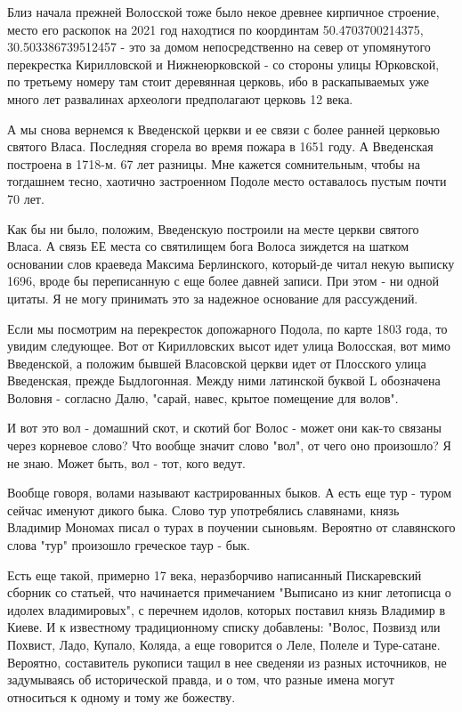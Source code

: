 \documentclass[a5paper,11pt,openany]{article}
\begin{document}
    Близ начала прежней Волосской тоже было некое древнее кирпичное строение, место его раскопок на 2021 год находтися по координтам
50.4703700214375, 30.503386739512457 - это за домом непосредственно на север от упомянутого перекрестка Кирилловской и Нижнеюрковской - со стороны улицы Юрковской, по третьему номеру там стоит деревянная церковь, ибо в раскапываемых уже много лет развалинах археологи предполагают церковь 12 века. 

   А мы снова вернемся к Введенской церкви и ее связи с более ранней церковью святого Власа. Последняя сгорела во время пожара в 1651 году. А Введенская построена в 1718-м. 67 лет разницы. Мне кажется сомнительным, чтобы на тогдашнем тесно, хаотично застроенном Подоле место оставалось пустым почти 70 лет. 

   Как бы ни было, положим, Введенскую построили на месте церкви святого Власа. А связь ЕЕ места со святилищем бога Волоса зиждется на шатком основании слов краеведа Максима Берлинского, который-де читал некую выписку 1696, вроде бы переписанную с еще более давней записи. При этом - ни одной цитаты. Я не могу принимать это за надежное основание для рассуждений.

   Если мы посмотрим на перекресток допожарного Подола, по карте 1803 года, то увидим следующее. Вот от Кирилловских высот идет улица Волосская, вот мимо Введенской, а положим бывшей Власовской церкви идет от Плосского улица Введенская, прежде Быдлогонная. Между ними латинской буквой L обозначена Воловня - согласно Далю, "сарай, навес, крытое помещение для волов".

   И вот это вол - домашний скот, и скотий бог Волос - может они как-то связаны через корневое слово? Что вообще значит слово "вол", от чего оно произошло? Я не знаю. Может быть, вол - тот, кого ведут.

   Вообще говоря, волами называют кастрированных быков. А есть еще тур - туром сейчас именуют дикого быка. Слово тур употребялись славянами, князь Владимир Мономах писал о турах в поучении сыновьям. Вероятно от славянского слова "тур" произошло греческое таур - бык.

   Есть еще такой, примерно 17 века, неразборчиво написанный Пискаревский сборник со статьей, что начинается примечанием "Выписано из книг летописца о идолех владимировых", с перечнем идолов, которых поставил князь Владимир в Киеве. И к известному традиционному списку добавлены: "Волос, Позвизд или Похвист, Ладо, Купало, Коляда, а еще говорится о Леле, Полеле и Туре-сатане. Вероятно, составитель рукописи тащил в нее сведеняи из разных источников, не задумываясь об исторической правда, и о том, что разные имена могут относиться к одному и тому же божеству. 
\end{document}
